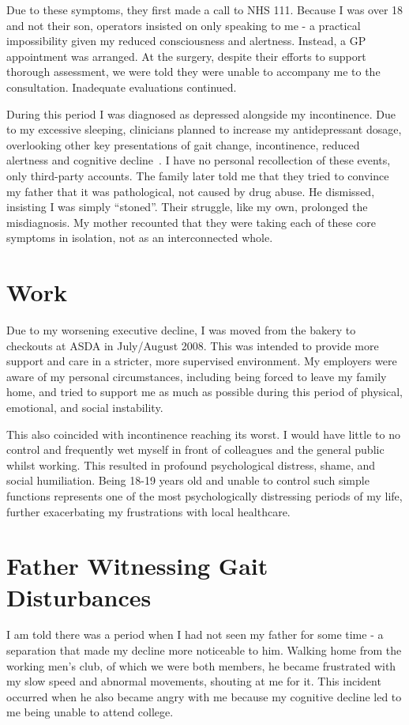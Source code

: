 \documentclass{article}
\begin{document}
Due to these symptoms, they first made a call to NHS 111. Because I was over 18 and not their son, operators insisted on only speaking to me - a practical impossibility given my reduced consciousness and alertness. Instead, a GP appointment was arranged. At the surgery, despite their efforts to support thorough assessment, we were told they were unable to accompany me to the consultation. Inadequate evaluations continued.

During this period I was diagnosed as depressed alongside my incontinence. Due to my excessive sleeping, clinicians planned to increase my antidepressant dosage, overlooking other key presentations of gait change, incontinence, reduced alertness and cognitive decline~\cite{houghton2021,jones2008,shefer2014,henderson2014}. I have no personal recollection of these events, only third-party accounts. The family later told me that they tried to convince my father that it was pathological, not caused by drug abuse. He dismissed, insisting I was simply “stoned”. Their struggle, like my own, prolonged the misdiagnosis. My mother recounted that they were taking each of these core symptoms in isolation, not as an interconnected whole.

\section*{Work}
Due to my worsening executive decline, I was moved from the bakery to checkouts at ASDA in July/August 2008. This was intended to provide more support and care in a stricter, more supervised environment. My employers were aware of my personal circumstances, including being forced to leave my family home, and tried to support me as much as possible during this period of physical, emotional, and social instability.

This also coincided with incontinence reaching its worst. I would have little to no control and frequently wet myself in front of colleagues and the general public whilst working. This resulted in profound psychological distress, shame, and social humiliation. Being 18-19 years old and unable to control such simple functions represents one of the most psychologically distressing periods of my life, further exacerbating my frustrations with local healthcare.

\section*{Father Witnessing Gait Disturbances}
I am told there was a period when I had not seen my father for some time - a separation that made my decline more noticeable to him. Walking home from the working men’s club, of which we were both members, he became frustrated with my slow speed and abnormal movements, shouting at me for it. This incident occurred when he also became angry with me because my cognitive decline led to me being unable to attend college.
\end{document}
